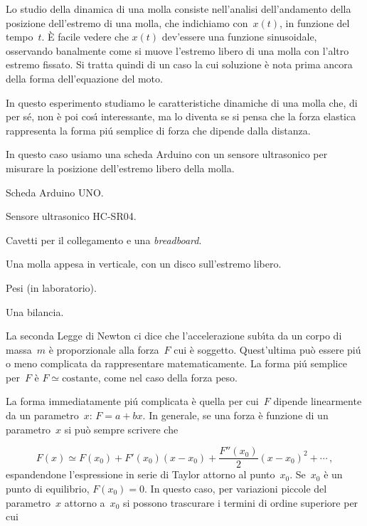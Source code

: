 \documentclass[12pt, a4paper]{physathome}   	%
\begin{document}
\begin{intro}
Lo studio della dinamica di una molla consiste nell'analisi dell'andamento della posizione dell'estremo  di una molla, che indichiamo con~$x(t)$, in funzione del tempo~$t$. \`E facile vedere che $x(t)$ dev'essere una funzione sinusoidale, osservando banalmente come si muove l'estremo libero di una molla con l'altro estremo fissato. Si tratta quindi di un caso la cui soluzione \`e nota prima ancora della forma dell'equazione del moto.

In questo esperimento studiamo le caratteristiche dinamiche di una molla che, di per s\'e, non \`e poi cos\'\i{} interessante, ma lo diventa se si pensa che la forza elastica rappresenta la forma pi\'u semplice di forza che dipende dalla distanza.

In questo caso usiamo una scheda Arduino con un sensore ultrasonico per misurare la posizione dell'estremo libero della molla. 
\end{intro}    
\begin{compactitem}
        \item Scheda Arduino UNO.
        \item Sensore ultrasonico HC-SR04.
        \item Cavetti per il collegamento e una {\em breadboard}.
        \item Una molla appesa in verticale, con un disco sull'estremo libero.
        \item Pesi (in laboratorio).
        \item Una bilancia.
\end{compactitem}

La seconda Legge di Newton ci dice che l'accelerazione sub\'\i{}ta da un corpo di massa~$m$ \`e proporzionale alla forza~$F$ cui \`e soggetto. Quest'ultima pu\`o essere pi\'u o meno complicata da rappresentare matematicamente. La forma pi\'u semplice per~$F$ \`e $F\simeq \mathrm{costante}$, come nel caso della forza peso.

La forma immediatamente pi\'u complicata \`e quella per cui~$F$ dipende linearmente da un parametro~$x$: $F = a+bx$. In generale, se una forza \`e funzione di un parametro~$x$ si pu\`o sempre scrivere che

\begin{equation}
F(x) \simeq F(x_0) + F'(x_0)\left(x-x_0\right)+\frac{F''(x_0)}{2}\left(x-x_0\right)^2+\cdots\,,
\end{equation}
espandendone l'espressione in serie di Taylor attorno al punto~$x_0$. Se~$x_0$ \`e un punto di equilibrio, $F(x_0)=0$. In questo caso, per variazioni piccole del parametro~$x$ attorno a~$x_0$ si possono trascurare i termini di ordine superiore per cui
\end{document}
